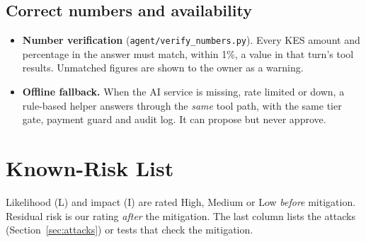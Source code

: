 \documentclass[10pt,a4paper]{article}
\newcommand{\code}[1]{\texttt{\small #1}}
\begin{document}
\subsection{Correct numbers and availability}
\begin{itemize}
  \item \textbf{Number verification} (\code{agent/verify\_numbers.py}). Every KES amount and percentage in the answer must match, within 1\%, a value in that turn's tool results. Unmatched figures are shown to the owner as a warning.
  \item \textbf{Offline fallback.} When the AI service is missing, rate limited or down, a rule-based helper answers through the \emph{same} tool path, with the same tier gate, payment guard and audit log. It can propose but never approve.
\end{itemize}

\section{Known-Risk List}
\label{sec:risks}

Likelihood (L) and impact (I) are rated High, Medium or Low \emph{before} mitigation. Residual risk is our rating \emph{after} the mitigation. The last column lists the attacks (Section~\ref{sec:attacks}) or tests that check the mitigation.
\end{document}
